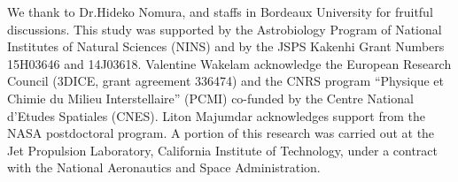 \documentclass{aastex61}
\begin{document}
\acknowledgments
We thank to Dr.Hideko Nomura, and staffs in Bordeaux University for fruitful discussions.
%
This study was supported by the Astrobiology Program of National Institutes of Natural Sciences (NINS) and by the JSPS Kakenhi Grant  Numbers 15H03646 and 14J03618.
%
Valentine Wakelam acknowledge the European Research Council (3DICE, grant agreement 336474) and the CNRS program ``Physique et Chimie du Milieu Interstellaire'' (PCMI) co-funded by the Centre National d'Etudes Spatiales (CNES).  
Liton Majumdar acknowledges support from the NASA postdoctoral program. 
%
A portion of this research was carried out at the Jet Propulsion Laboratory, California Institute of Technology, under a
contract with the National Aeronautics and Space Administration.







\end{document}
